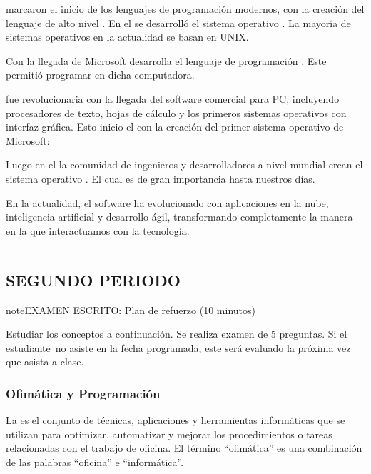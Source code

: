 \documentclass[letterpaper,10pt,spanish]{sphinxmanual}
\begin{document}
\sphinxAtStartPar
{} marcaron el inicio de los lenguajes de programación modernos, con la creación del lenguaje de alto nivel . En el  se desarrolló el sistema operativo . La mayoría de sistemas operativos en la actualidad se basan en UNIX.

\sphinxAtStartPar
Con la llegada de  Microsoft desarrolla el lenguaje de programación . Este permitió programar en dicha computadora.

\sphinxAtStartPar
{} fue revolucionaria con la llegada del software comercial para PC, incluyendo procesadores de texto, hojas de cálculo y los primeros sistemas operativos con interfaz gráfica. Esto inicio el  con la creación del primer sistema operativo de Microsoft: 

\sphinxAtStartPar
Luego en el  la comunidad de ingenieros y desarrolladores a nivel mundial crean el sistema operativo . El cual es de gran importancia hasta nuestros días.

\sphinxAtStartPar
En la actualidad, el software ha evolucionado con aplicaciones en la nube, inteligencia artificial y desarrollo ágil, transformando completamente la manera en la que interactuamos con la tecnología.


\bigskip\hrule\bigskip



\subsection{SEGUNDO PERIODO}
\label{\detokenize{1_guias/10informatica/G1009:segundo-periodo}}
\begin{sphinxadmonition}{note}{EXAMEN ESCRITO: Plan de refuerzo (10 minutos)}

\sphinxAtStartPar
Estudiar los conceptos a continuación. Se realiza examen de 5 preguntas. Si el estudiante no asiste en la fecha programada, este será evaluado la próxima vez que asista a clase.
\end{sphinxadmonition}


\subsubsection{Ofimática y Programación}
\label{\detokenize{1_guias/10informatica/G1009:ofimatica-y-programacion}}
\sphinxAtStartPar
La  es el conjunto de técnicas, aplicaciones y herramientas informáticas que se utilizan para optimizar, automatizar y mejorar los procedimientos o tareas relacionadas con el trabajo de oficina. El término “ofimática” es una combinación de las palabras “oficina” e “informática”.
\end{document}
